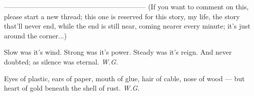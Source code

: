 --------------------------------------------------------------
(If you want to comment on this, please start a new thread; this one is reserved for this story, my life, the story that'll never end, while the end is still near, coming nearer every minute; it's just around the corner...)

Slow 
was it's wind. 
Strong 
was it's power. 
Steady 
was it's reign. 
And never doubted; 
as silence 
was eternal. 
\emph{W.G.}

Eyes of plastic, 
ears of paper, 
mouth of glue, 
hair of cable, 
nose of wood --- 
but heart of gold 
beneath the shell 
of rust. 
\emph{W.G.}

